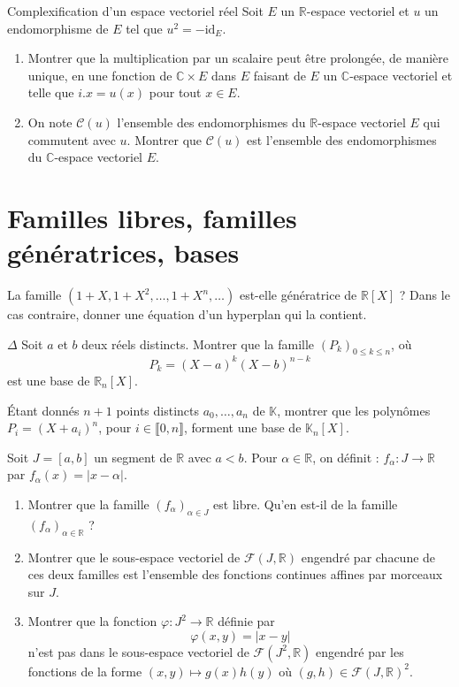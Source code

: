 \documentclass[french,a4paper]{article}
\newcommand{\R}{\mathbb{R}}
\newcommand{\C}{\mathbb{C}}
\newcommand{\K}{\mathbb{K}}
\theoremstyle{plain}
\theoremstyle{definition}
\theoremstyle{remark}
\begin{document}
\begin{ex}[Moulin.07]{Complexification d'un espace vectoriel réel}
	Soit $E$ un $\R$-espace vectoriel et $u$ un endomorphisme de $E$ tel que $u^2=-\text{id}_E$.
	\begin{enumerate}
		\item Montrer que la multiplication par un scalaire peut être prolongée, de manière unique, en une fonction de $\C\times E$ dans $E$ faisant de $E$ un $\C$-espace vectoriel et telle que $i.x=u(x)$ pour tout $x\in E$.
		\item On note $\mathcal{C}(u)$ l'ensemble des endomorphismes du $\R$-espace vectoriel $E$ qui commutent avec $u$. Montrer que $\mathcal{C}(u)$ est l'ensemble des endomorphismes du $\C$-espace vectoriel $E$.
	\end{enumerate}
\end{ex}

\section{Familles libres, familles génératrices, bases}

\begin{ex}[Moulin.08]{}
	La famille $(1+X,1+X^2,\ldots,1+X^n,\ldots)$ est-elle génératrice de $\R[X]$ ? Dans le cas contraire, donner une équation d'un hyperplan qui la contient.
\end{ex}

\begin{ex}[Moulin.09]{$\Delta$}
	Soit $a$ et $b$ deux réels distincts. Montrer que la famille $(P_k)_{0\leqslant k\leqslant n}$, où $$P_k=(X-a)^k(X-b)^{n-k}$$ est une base de $\R_n[X]$.
\end{ex}

\begin{ex}[Moulin.10]{}
	Étant donnés $n+1$ points distincts $a_0,\ldots,a_n$ de $\K$, montrer que les polynômes $P_i=(X+a_i)^n$, pour $i\in\llbracket0,n\rrbracket$, forment une base de $\K_n[X]$.
\end{ex}

\begin{ex}[Moulin.11]{}
	Soit $J=[a,b]$ un segment de $\R$ avec $a<b$. Pour $\alpha\in\R$, on définit : $f_\alpha:J\to\R$ par $f_\alpha(x)=\lvert x-\alpha\rvert$.
	\begin{enumerate}
		\item Montrer que la famille $(f_\alpha)_{\alpha\in J}$ est libre. Qu'en est-il de la famille $(f_\alpha)_{\alpha\in\R}$ ?
		\item Montrer que le sous-espace vectoriel de $\mathcal{F}(J,\R)$ engendré par chacune de ces deux familles est l'ensemble des fonctions continues affines par morceaux sur $J$.
		\item Montrer que la fonction $\varphi:J^2\to\R$ définie par $$\varphi(x,y)=\lvert x-y\rvert$$ n'est pas dans le sous-espace vectoriel de $\mathcal{F}(J^2,\R)$ engendré par les fonctions de la forme $(x,y)\mapsto g(x)h(y)$ où $(g,h)\in\mathcal{F}(J,\R)^2$.
	\end{enumerate}
\end{ex}
\end{document}
